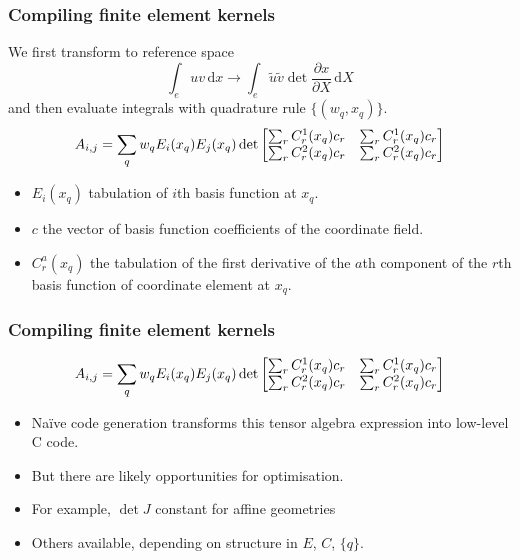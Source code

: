 \documentclass[presentation]{beamer}
\begin{document}
\begin{frame}[fragile]
  \frametitle{Compiling finite element kernels}
  We first transform to reference space
  \begin{equation*}
    \int_e u v\, \text{d}x \rightarrow \int_e \tilde{u} \tilde{v} \det{\frac{\partial x}{\partial
        X}}\,\text{d} X
  \end{equation*}
  and then evaluate integrals with quadrature rule $\{(w_q, x_q)\}$.
  \begin{equation*}
    A_{i,j} = \sum_{q} w_q E_i(x_q) E_j(x_q) \det{%
      \begin{bmatrix}
        \sum_r C_r^1(x_q) c_r & \sum_r C_r^1(x_q) c_r \\
        \sum_r C_r^2(x_q) c_r & \sum_r C_r^2(x_q) c_r
      \end{bmatrix}
    }
  \end{equation*}
  \begin{itemize}
  \item $E_i(x_q)$ tabulation of $i$th basis function at $x_q$.
  \item $c$ the vector of basis function coefficients of the
    coordinate field.
  \item $C_r^a(x_q)$ the tabulation of the first derivative of the
    $a$th component of the $r$th basis function of coordinate element
    at $x_q$.
  \end{itemize}
\end{frame}
\begin{frame}
  \frametitle{Compiling finite element kernels}
  \begin{equation*}
    A_{i,j} = \sum_{q} w_q E_i(x_q) E_j(x_q) \det{%
      \begin{bmatrix}
        \sum_r C_r^1(x_q) c_r & \sum_r C_r^1(x_q) c_r \\
        \sum_r C_r^2(x_q) c_r & \sum_r C_r^2(x_q) c_r
      \end{bmatrix}
    }
  \end{equation*}

  \begin{itemize}
  \item Na\"ive code generation transforms this tensor algebra
    expression into low-level C code.
  \item But there are likely opportunities for optimisation.
  \item For example, $\det J$ constant for affine geometries
  \item Others available, depending on structure in $E$, $C$, $\{q\}$.
  \end{itemize}
\end{frame}
\end{document}
